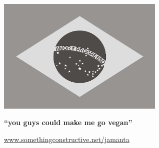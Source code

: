 \clearevenpage

\begin{center}

  \thispagestyle{empty}

  \includegraphics[width=8cm]{brasil.jpg}

  \bigskip

  \LARGE{\textbf{``you guys could make me go vegan''}}

  \bigskip
  \bigskip

  \large{\href{http://www.somethingconstructive.net/jamanta}{www.somethingconstructive.net/jamanta}}

\end{center}
